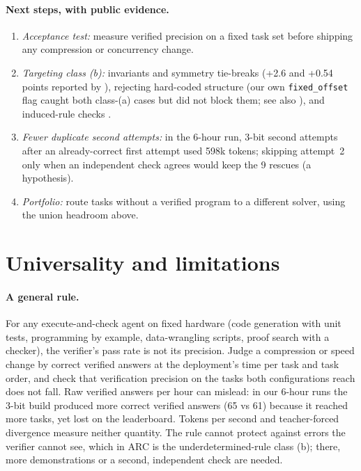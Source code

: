 \documentclass[11pt]{article}
\begin{document}
\paragraph{Next steps, with public evidence.}
\begin{enumerate}
\item \emph{Acceptance test:} measure verified precision on a fixed task set before shipping any compression or concurrency change.
\item \emph{Targeting class (b):} invariants and symmetry tie-breaks (+2.6 and +0.54 points reported by \cite{notnitsuj2026}), rejecting hard-coded structure (our own \texttt{fixed\_offset} flag caught both class-(a) cases but did not block them; see also \cite{majkel2026}), and induced-rule checks \cite{ni2026}.
\item \emph{Fewer duplicate second attempts:} in the 6-hour run, 3-bit second attempts after an already-correct first attempt used 598k tokens; skipping attempt~2 only when an independent check agrees would keep the 9 rescues (a hypothesis).
\item \emph{Portfolio:} route tasks without a verified program to a different solver, using the union headroom above.
\end{enumerate}

\section{Universality and limitations}
\paragraph{A general rule.} For any execute-and-check agent on fixed hardware (code generation with unit tests, programming by example, data-wrangling scripts, proof search with a checker), the verifier's pass rate is not its precision. Judge a compression or speed change by correct verified answers at the deployment's time per task and task order, and check that verification precision on the tasks both configurations reach does not fall. Raw verified answers per hour can mislead: in our 6-hour runs the 3-bit build produced more correct verified answers (65 vs 61) because it reached more tasks, yet lost on the leaderboard. Tokens per second and teacher-forced divergence measure neither quantity. The rule cannot protect against errors the verifier cannot see, which in ARC is the underdetermined-rule class (b); there, more demonstrations or a second, independent check are needed.
\end{document}
